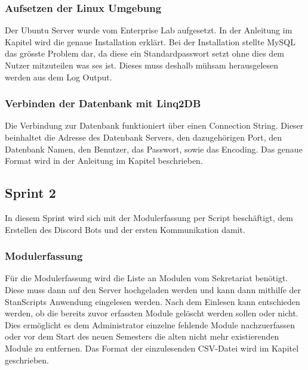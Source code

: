 \documentclass[a4paper, table]{article}
\begin{document}
\subsubsection{Aufsetzen der Linux Umgebung}

Der Ubuntu Server wurde vom Enterprise Lab aufgesetzt.
In der Anleitung im Kapitel  wird die genaue Installation erklärt.
Bei der Installation stellte MySQL das grösste Problem dar, da diese ein Standardpasswort setzt ohne dies dem Nutzer mitzuteilen was ses ist.
Dieses muss deshalb mühsam herausgelesen werden aus dem Log Output.

\subsubsection{Verbinden der Datenbank mit Linq2DB}

Die Verbindung zur Datenbank funktioniert über einen Connection String.
Dieser beinhaltet die Adresse des Datenbank Servers, den dazugehörigen Port, den Datenbank Namen, den Benutzer, das Passwort, sowie das Encoding.
Das genaue Format wird in der Anleitung im Kapitel  beschrieben.

\newpage
\subsection{Sprint 2}
In diesem Sprint wird sich mit der Modulerfassung per Script beschäftigt,
dem Erstellen des Discord Bots und der ersten Kommunikation damit.

\subsubsection{Modulerfassung}

Für die Modulerfassung wird die Liste an Modulen vom Sekretariat benötigt.
Diese muss dann auf den Server hochgeladen werden und kann dann mithilfe der StanScripts Anwendung eingelesen werden.
Nach dem Einlesen kann entschieden werden, ob die bereits zuvor erfassten Module gelöscht werden sollen oder nicht.
Dies ermöglicht es dem Administrator einzelne fehlende Module nachzuerfassen oder vor dem Start des neuen Semesters die alten nicht mehr existierenden Module zu entfernen.
Das Format der einzulesenden \gls{CSV}-Datei wird im Kapitel  geschrieben.
\end{document}
